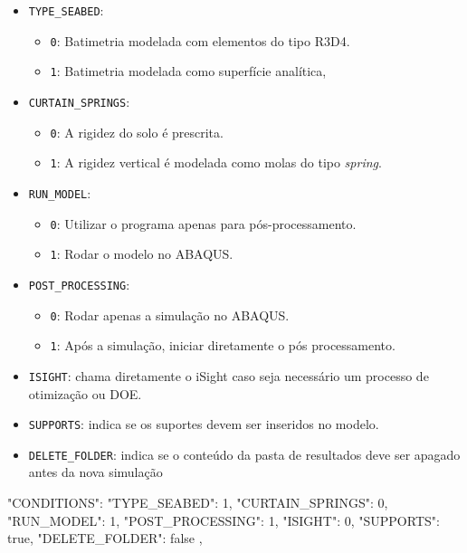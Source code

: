 \begin{itemize}
  \item \texttt{TYPE\_SEABED}:
  \begin{itemize}
    \item \texttt{0}: Batimetria modelada com elementos do tipo R3D4.
    \item \texttt{1}: Batimetria modelada como superfície analítica,
  \end{itemize}
  \item  \texttt{CURTAIN\_SPRINGS}:
    \begin{itemize}
      \item \texttt{0}: A rigidez do solo é prescrita.
      \item \texttt{1}: A rigidez vertical é modelada como molas do tipo \textit{spring}.
    \end{itemize}
  \item \texttt{RUN\_MODEL}:
    \begin{itemize}
      \item \texttt{0}: Utilizar o programa apenas para pós-processamento.
      \item \texttt{1}: Rodar o modelo no ABAQUS.
    \end{itemize}
  \item \texttt{POST\_PROCESSING}:
    \begin{itemize}
      \item \texttt{0}: Rodar apenas a simulação no ABAQUS.
      \item \texttt{1}: Após a simulação, iniciar diretamente o pós processamento.
    \end{itemize}
  \item \texttt{ISIGHT}: chama diretamente o iSight caso seja necessário um processo de otimização ou DOE\@.
  \item \texttt{SUPPORTS}: indica se os suportes devem ser inseridos no modelo.
  \item \texttt{DELETE\_FOLDER}: indica se o conteúdo da pasta de resultados deve ser apagado antes da nova simulação
\end{itemize}

\begin{jsoncode}
{
  "CONDITIONS": {
    "TYPE_SEABED": 1,
    "CURTAIN_SPRINGS": 0,
    "RUN_MODEL": 1,
    "POST_PROCESSING": 1,
    "ISIGHT": 0,
    "SUPPORTS": true,
    "DELETE_FOLDER": false
  },
}
\end{jsoncode}

